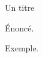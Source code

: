 \begin{titlebox}{Un titre}
  \begin{theorem}Énoncé.\end{theorem} %
  \begin{example}Exemple.\end{example}
\end{titlebox}
